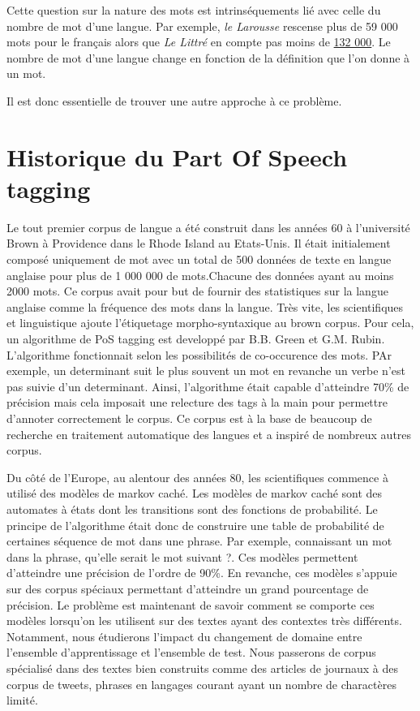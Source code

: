\documentclass[french, 14pt]{memoir}
\begin{document}
Cette question sur la nature des mots est intrinséquements lié avec celle du nombre de mot d'une langue. Par exemple, \textit{le Larousse} rescense plus de 59 000 mots pour le français alors que \textit{Le Littré} en compte pas moins de \href{https://fr.babbel.com/fr/magazine/quelle-langue-contient-le-plus-de-mots}{132 000}. Le nombre de mot d'une langue change en fonction de la définition que l'on donne à un mot.

Il est donc essentielle de trouver une autre approche à ce problème.

\section{Historique du Part Of Speech tagging}

Le tout premier corpus de langue a été construit dans les années 60 à l'université Brown à Providence dans le Rhode Island au Etats-Unis. Il était initialement composé uniquement de mot avec un total de 500 données de texte en langue anglaise pour plus de 1 000 000 de mots.Chacune des données ayant au moins 2000 mots. Ce corpus avait pour but de fournir des statistiques sur la langue anglaise comme la fréquence des mots dans la langue. 
Très vite, les scientifiques et linguistique ajoute l'étiquetage morpho-syntaxique au brown corpus. Pour cela, un algorithme de PoS tagging est developpé par B.B. Green et G.M. Rubin. L'algorithme fonctionnait selon les possibilités de co-occurence des mots. PAr exemple, un determinant suit le plus souvent un mot en revanche un verbe n'est pas suivie d'un determinant. Ainsi, l'algorithme était capable d'atteindre 70\% 
de précision mais cela imposait une relecture des tags à la main pour permettre d'annoter correctement le corpus. Ce corpus est à la base de beaucoup de recherche en traitement automatique des langues et a inspiré de nombreux autres corpus. 

Du côté de l'Europe, au alentour des années 80, les scientifiques commence à utilisé des modèles de markov caché. Les modèles de markov caché sont des automates à états dont les transitions sont des fonctions de probabilité. Le principe de l'algorithme était donc de construire une table de probabilité de certaines séquence de mot dans une phrase. Par exemple, connaissant un mot dans la phrase, qu'elle serait le mot suivant ?. Ces modèles permettent d'atteindre une précision de l'ordre de 90\%. En revanche, ces modèles s'appuie sur des corpus spéciaux permettant d'atteindre un grand pourcentage de précision. Le problème est maintenant de savoir comment se comporte ces modèles lorsqu'on les utilisent sur des textes ayant des contextes très différents.
Notamment, nous étudierons l'impact du changement de domaine entre l'ensemble d'apprentissage et l'ensemble de test. Nous passerons de corpus spécialisé dans des textes bien construits comme des articles de journaux à des corpus de tweets, phrases en langages courant ayant un nombre de charactères limité. 
\end{document}
